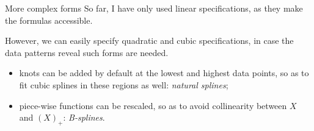 \documentclass[12pt,english,pdf,xcolor=dvipsnames,aspectratio=169,handout]{beamer}\usepackage[]{graphicx}\usepackage[]{xcolor}
\begin{document}
\begin{frame}{More complex forms}
  So far, I have only used linear specifications, as they make the formulas accessible.\bigskip

  However, we can easily specify quadratic and cubic specifications, in case the data patterns reveal such forms are needed.\bigskip

  \begin{itemize}
  \item knots can be added by default at the lowest and highest data points, so as to fit cubic splines in these regions as well: \textit{natural splines};
  \item piece-wise functions can be rescaled, so as to avoid collinearity between $X$ and $(X)_+$: \textit{B-splines}. 
  \end{itemize}
  
\end{frame}
\end{document}
